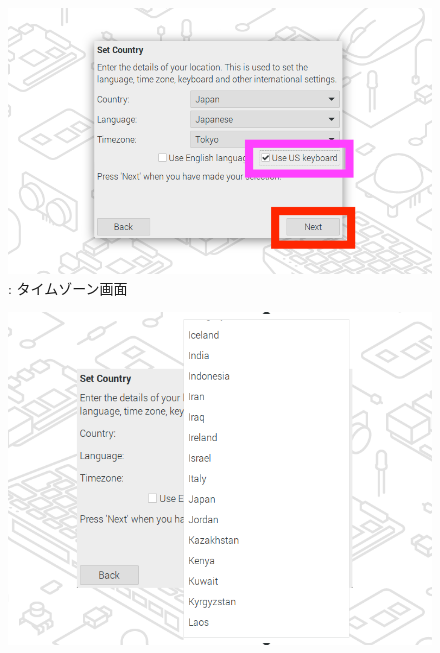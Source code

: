 \documentclass[a4paper,12pt]{jarticle}
\begin{document}
\begin{enumerate}
\begin{itemize}
              
                \begin{figure}[h]
                \centering
                \begin{minipage}{0.45\textwidth}
                  {\upshape
                    \includegraphics[width=\linewidth]{sw_image02.png}
                    \newline
                    {\theFigure\label{seq:refFigure9}}:
                    タイムゾーン画面}
                \end{minipage}
                \hfill
                \centering
                \begin{minipage}{0.45\textwidth}
                  {\upshape
                    \includegraphics[width=\linewidth]{sw_image03-2.png}
                    \newline
}
\end{minipage}
\end{figure}
\end{itemize}
\end{enumerate}
\end{document}

